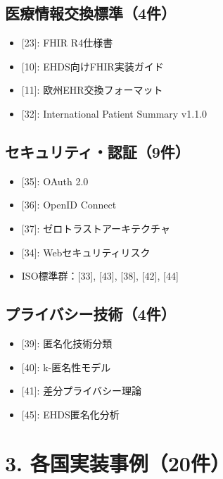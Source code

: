 \documentclass[
  a4paper,
  a4paper,
  11pt]{ltjsbook}
\providecommand{\tightlist}{%
  \setlength{\itemsep}{0pt}\setlength{\parskip}{0pt}}
\begin{document}
\subsection{医療情報交換標準（4件）}\label{ux533bux7642ux60c5ux5831ux4ea4ux63dbux6a19ux6e964ux4ef6}

\begin{itemize}
\tightlist
\item
  {[}23{]}: FHIR R4仕様書
\item
  {[}10{]}: EHDS向けFHIR実装ガイド
\item
  {[}11{]}: 欧州EHR交換フォーマット
\item
  {[}32{]}: International Patient Summary v1.1.0
\end{itemize}

\subsection{セキュリティ・認証（9件）}\label{ux30bbux30adux30e5ux30eaux30c6ux30a3ux8a8dux8a3c9ux4ef6}

\begin{itemize}
\tightlist
\item
  {[}35{]}: OAuth 2.0
\item
  {[}36{]}: OpenID Connect
\item
  {[}37{]}: ゼロトラストアーキテクチャ
\item
  {[}34{]}: Webセキュリティリスク
\item
  ISO標準群：{[}33{]}, {[}43{]}, {[}38{]}, {[}42{]}, {[}44{]}
\end{itemize}

\subsection{プライバシー技術（4件）}\label{ux30d7ux30e9ux30a4ux30d0ux30b7ux30fcux6280ux88534ux4ef6}

\begin{itemize}
\tightlist
\item
  {[}39{]}: 匿名化技術分類
\item
  {[}40{]}: k-匿名性モデル
\item
  {[}41{]}: 差分プライバシー理論
\item
  {[}45{]}: EHDS匿名化分析
\end{itemize}

\section{3.
各国実装事例（20件）}\label{ux5404ux56fdux5b9fux88c5ux4e8bux4f8b20ux4ef6}
\end{document}
